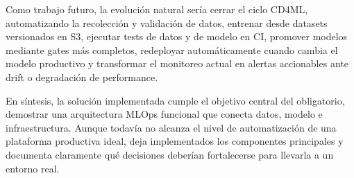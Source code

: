 \documentclass[letterpaper,12pt]{article}
\begin{document}
Como trabajo futuro, la evolución natural sería cerrar el ciclo CD4ML, automatizando la recolección y validación de datos, entrenar desde datasets versionados en S3, ejecutar tests de datos y de modelo en CI, promover modelos mediante gates más completos, redeployar automáticamente cuando cambia el modelo productivo y transformar el monitoreo actual en alertas accionables ante drift o degradación de performance.

En síntesis, la solución implementada cumple el objetivo central del obligatorio, demostrar una arquitectura MLOps funcional que conecta datos, modelo e infraestructura. Aunque todavía no alcanza el nivel de automatización de una plataforma productiva ideal, deja implementados los componentes principales y documenta claramente qué decisiones deberían fortalecerse para llevarla a un entorno real.


\newpage


\end{document}
